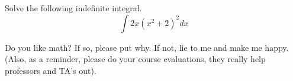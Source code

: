 \documentclass[11pt,epsfig]{article}
\begin{document}
\newpage

\begin{problem}{1}
Solve the following indefinite integral.
\begin{equation*}
\int 2x(x^2 + 2) ^2 dx
\end{equation*}
\vfill
\end{problem}

\begin{problem}{9}
Do you like math? If so, please put why. If not, lie to me and make me happy. (Also, as a reminder, please do your course evaluations, they really help professors and TA's out).
\vfill
\end{problem}






\showpoints
\end{document}
